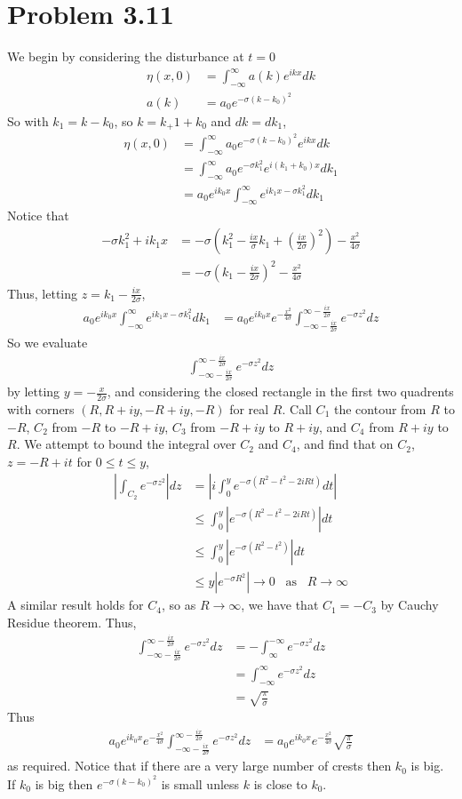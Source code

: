 \documentclass[12pt]{article}
\newcommand{\eq}[1]{\begin{align*}#1\end{align*}}
\newcommand{\on}[1]{\operatorname{#1}}
\begin{document}
\section*{Problem 3.11}
We begin by considering the disturbance at $t = 0$
\eq{
	\eta(x,0) &= \int_{-\infty}^\infty a(k)e^{ikx}dk\\
	a(k) &= a_0 e^{-\sigma(k - k_0)^2}
}
So with $k_1 = k - k_0$, so $k = k_+1 + k_0$ and $dk = dk_1$,
\eq{
	\eta(x, 0) &= \int_{-\infty}^\infty a_0 e^{-\sigma(k - k_0)^2}e^{ikx}dk\\
	&= \int_{-\infty}^\infty a_0 e^{-\sigma k_1^2}e^{i(k_1 + k_0)x}dk_1\\
	&= a_0 e^{ik_0x}\int_{-\infty}^\infty e^{ik_1 x - \sigma k_1^2} dk_1
}
Notice that
\eq{
	-\sigma k_1^2 + ik_1x &= -\sigma(k_1^2 - \frac{ix}{\sigma}k_1 + \left(\frac{ix}{2\sigma}\right)^2) - \frac{x^2}{4\sigma}\\
	&= -\sigma(k_1 - \frac{ix}{2\sigma})^2 - \frac{x^2}{4\sigma}
}
Thus, letting $z = k_1 - \frac{ix}{2\sigma}$,
\eq{
	a_0 e^{ik_0x}\int_{-\infty}^\infty e^{ik_1 x - \sigma k_1^2} dk_1 &= a_0e^{ik_0 x}e^{-\frac{x^2}{4\sigma}}\int_{-\infty - \frac{ix}{2\sigma}}^{\infty - \frac{ix}{2\sigma}} e^{-\sigma z^2}dz
}
So we evaluate
\eq{
	\int_{-\infty - \frac{ix}{2\sigma}}^{\infty - \frac{ix}{2\sigma}} e^{-\sigma z^2}dz
}
by letting $y = -\frac{x}{2\sigma}$, and considering the closed rectangle in the first two quadrents with corners $(R, R+iy, -R+iy, -R)$ for real $R$. Call $C_1$ the contour from $R$ to $-R$, $C_2$ from $-R$ to $-R+iy$, $C_3$ from $-R+iy$ to $R+iy$, and $C_4$ from $R+iy$ to $R$. 
We attempt to bound the integral over $C_2$ and $C_4$, and find that on $C_2$, $z = -R+it$ for $0 \leq t \leq y$,
\eq{
	|\int_{C_2} e^{-\sigma z^2}| dz &= |i\int_0^y e^{-\sigma (R^2 - t^2 - 2iRt)} dt|\\
	&\leq \int_0^y |e^{-\sigma (R^2 - t^2 - 2iRt)}| dt\\
	&\leq \int_0^y |e^{-\sigma (R^2 - t^2)}| dt\\
	&\leq y|e^{-\sigma R^2}| \rightarrow 0\;\;\on{as}\;\;R\rightarrow\infty
}
A similar result holds for $C_4$, so as $R \rightarrow \infty$, we have that $C_1 = -C_3$ by Cauchy Residue theorem. Thus,
\eq{
	\int_{-\infty - \frac{ix}{2\sigma}}^{\infty - \frac{ix}{2\sigma}} e^{-\sigma z^2}dz &= -\int_{\infty}^{-\infty} e^{-\sigma z^2}dz \\
	&= \int_{-\infty}^{\infty} e^{-\sigma z^2}dz\\
	&= \sqrt{\frac{\pi}{\sigma}}
}
Thus
\eq{
	a_0e^{ik_0 x}e^{-\frac{x^2}{4\sigma}}\int_{-\infty - \frac{ix}{2\sigma}}^{\infty - \frac{ix}{2\sigma}} e^{-\sigma z^2}dz &= a_0e^{ik_0 x}e^{-\frac{x^2}{4\sigma}}\sqrt{\frac{\pi}{\sigma}}
}
as required. Notice that if there are a very large number of crests then $k_0$ is big. If $k_0$ is big then $e^{-\sigma(k - k_0)^2}$ is small unless $k$ is close to $k_0$.
\end{document}

